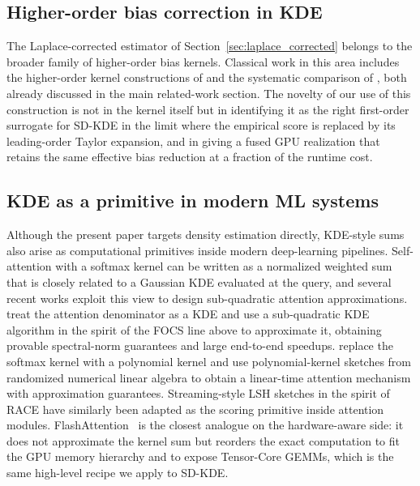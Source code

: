 \subsection{Higher-order bias correction in KDE}
\label{app:higher_order_literature}

The Laplace-corrected estimator of Section~\ref{sec:laplace_corrected}
belongs to the broader family of higher-order bias kernels.
Classical work in this area includes the higher-order kernel constructions
of \citet{fan1992bias} and the systematic comparison of
\citet{jones1997comparison}, both already discussed in the main related-work
section.
The novelty of our use of this construction is not in the kernel itself but
in identifying it as the right first-order surrogate for SD-KDE in the
limit where the empirical score is replaced by its leading-order Taylor
expansion, and in giving a fused GPU realization that retains the same
effective bias reduction at a fraction of the runtime cost.

\subsection{KDE as a primitive in modern ML systems}
\label{app:kde_attention_literature}

Although the present paper targets density estimation directly, KDE-style
sums also arise as computational primitives inside modern deep-learning
pipelines.
Self-attention with a softmax kernel can be written as a normalized
weighted sum that is closely related to a Gaussian KDE evaluated at the
query, and several recent works exploit this view to design
sub-quadratic attention approximations.
\citet{zandieh2023kdeformer} treat the attention denominator as a KDE and
use a sub-quadratic KDE algorithm in the spirit of the FOCS line above to
approximate it, obtaining provable spectral-norm guarantees and large
end-to-end speedups.
\citet{kacham2024polysketchformer} replace the softmax kernel with a
polynomial kernel and use polynomial-kernel sketches from randomized
numerical linear algebra to obtain a linear-time attention mechanism with
approximation guarantees.
Streaming-style LSH sketches in the spirit of RACE \citep{coleman2020race}
have similarly been adapted as the scoring primitive inside attention
modules.
FlashAttention~\citep{dao2022flashattention} is the closest analogue on the
hardware-aware side: it does not approximate the kernel sum but reorders
the exact computation to fit the GPU memory hierarchy and to expose
Tensor-Core GEMMs, which is the same high-level recipe we apply to SD-KDE.

